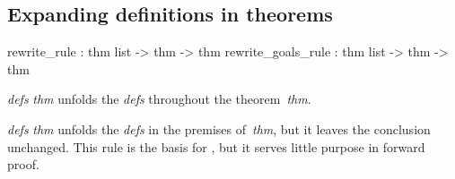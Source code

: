 \subsection{Expanding definitions in theorems}
\begin{ttbox} 
rewrite_rule       : thm list -> thm -> thm
rewrite_goals_rule : thm list -> thm -> thm
\end{ttbox}
\begin{ttdescription}
\item[\ttindexbold{rewrite_rule} {\it defs} {\it thm}]  
unfolds the {\it defs} throughout the theorem~{\it thm}.

\item[\ttindexbold{rewrite_goals_rule} {\it defs} {\it thm}]  
unfolds the {\it defs} in the premises of~{\it thm}, but it leaves the
conclusion unchanged.  This rule is the basis for ,
but it serves little purpose in forward proof.
\end{ttdescription}


